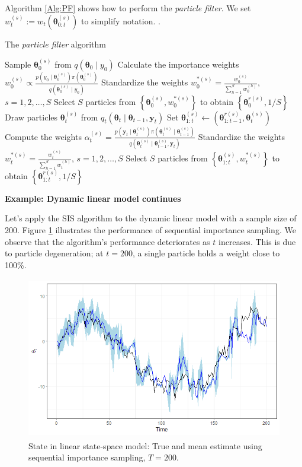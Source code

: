 Algorithm \ref{Alg:PF} shows how to perform the \textit{particle filter}. We set $w_t^{(s)}:=w_t(\bm{\theta}_{0:t}^{(s)})$ to simplify notation. \cite{doucet2009tutorial}.\\
\begin{algorithm}[h!]
	\caption{The \textit{particle filter} algorithm}\label{Alg:PF}
	\begin{algorithmic}[1]
		\State Sample $\bm{\theta}_0^{(s)}$ from $q(\bm{\theta}_0\mid y_0)$
		\State Calculate the importance weights $w_0^{(s)}\propto\frac{p(y_0\mid \bm{\theta}_0^{(s)})\pi(\bm{\theta}_0^{(s)})}{q(\bm{\theta}_0^{(s)}\mid y_0)}$
		\EndFor
		\State Standardize the weights $w_0^{*(s)}=\frac{w_0^{(s)}}{\sum_{h=1}^Sw_0^{(h)}}$, $s=1,2,\dots,S$
		\State Select $S$ particles from $\left\{\bm{\theta}_0^{(s)},w_0^{*(s)}\right\}$ to obtain $\left\{\bm{\theta}_0^{r(s)},1/S\right\}$  
		\State Draw particles $\bm{\theta}_t^{(s)}$ from $q_t(\bm{\theta}_t\mid \bm{\theta}_{t-1}, \bm{y}_t)$
		\State Set $\bm{\theta}_{1:t}^{(s)}\leftarrow (\bm{\theta}_{1:t-1}^{r(s)},\bm{\theta}_{t}^{(s)})$ 
		\State Compute the weights $\alpha_t^{(s)}=\frac{p(\bm{y}_{t}\mid \bm{\theta}_{t}^{(s)})\pi(\bm{\theta}_{t}^{(s)}\mid \bm{\theta}_{t-1}^{(s)})}{q(\bm{\theta}_t^{(s)}\mid \bm{\theta}_{t-1}^{(s)},\bm{y}_{t})}$		
		\EndFor
		\State Standardize the weights $w_t^{*(s)}=\frac{w_t^{(s)}}{\sum_{h=1}^Sw_t^{(h)}}$, $s=1,2,\dots,S$ 
		\State Select $S$ particles from $\left\{\bm{\theta}_{1:t}^{(s)},w_t^{*(s)}\right\}$ to obtain $\left\{\bm{\theta}_{1:t}^{r(s)},1/S\right\}$  
		\EndFor
	\end{algorithmic} 
\end{algorithm}

\textbf{Example: Dynamic linear model continues}

Let's apply the SIS algorithm to the dynamic linear model with a sample size of 200. Figure \ref{fig59} illustrates the performance of sequential importance sampling. We observe that the algorithm's performance deteriorates as $t$ increases. This is due to particle degeneration; at $t=200$, a single particle holds a weight close to 100\%.

\begin{figure}[!h]
	\includegraphics[width=340pt, height=200pt]{Chapters/chapter5/figures/SIS200.png}
	\caption[List of figure caption goes here]{State in linear state-space model: True and mean estimate using sequential importance sampling, $T=200$.}\label{fig59}
\end{figure} 

